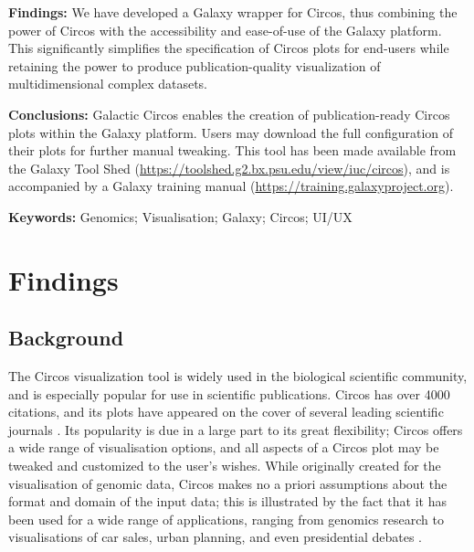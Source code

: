 \textbf{Findings:} We have developed a Galaxy wrapper for Circos, thus combining the power of Circos with the accessibility and ease-of-use of the Galaxy platform. This significantly simplifies the specification of Circos plots for end-users while retaining the power to produce publication-quality visualization of multidimensional complex datasets.


\textbf{Conclusions:} Galactic Circos enables the creation of publication-ready Circos plots within the Galaxy platform. Users may download the full configuration of their plots for further manual tweaking. This tool has been made available from the Galaxy Tool Shed (\url{https://toolshed.g2.bx.psu.edu/view/iuc/circos}), and is accompanied by a Galaxy training manual (\url{https://training.galaxyproject.org}).

\textbf{Keywords: } Genomics; Visualisation; Galaxy; Circos; UI/UX


\section*{Findings}

\subsection*{Background}


The Circos visualization tool \cite{krzywinski2009} is widely used in the biological scientific community, and is especially popular for use in scientific publications. Circos has over 4000 citations, and its plots have appeared on the cover of several leading scientific journals \cite{circospubs}. Its popularity is due in a large part to its great flexibility; Circos offers a wide range of visualisation options, and all aspects of a Circos plot may be tweaked and customized to the user's wishes. While originally created for the visualisation of genomic data, Circos makes no a priori assumptions about the format and domain of the input data; this is illustrated by the fact that it has been used for a wide range of applications, ranging from genomics research to visualisations of car sales, urban planning, and even presidential debates \cite{circosnongenomic}.

